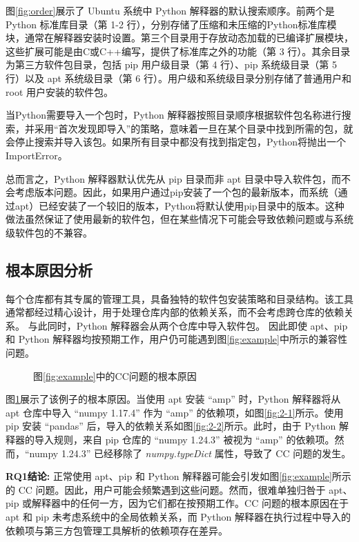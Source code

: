 图\ref{fig:order}展示了 Ubuntu 系统中 Python 解释器的默认搜索顺序。前两个是 Python 标准库目录（第 1-2 行），分别存储了压缩和未压缩的Python标准库模块，通常在解释器安装时设置。第三个目录用于存放动态加载的已编译扩展模块，这些扩展可能是由C或C++编写，提供了标准库之外的功能（第 3 行）。其余目录为第三方软件包目录，包括 pip 用户级目录（第 4 行）、pip 系统级目录（第 5 行）以及 apt 系统级目录（第 6 行）。用户级和系统级目录分别存储了普通用户和 root 用户安装的软件包。

当Python需要导入一个包时，Python 解释器按照目录顺序根据软件包名称进行搜索，并采用“首次发现即导入”的策略，意味着一旦在某个目录中找到所需的包，就会停止搜索并导入该包。如果所有目录中都没有找到指定包，Python将抛出一个ImportError。

总而言之，Python 解释器默认优先从 pip 目录而非 apt 目录中导入软件包，而不会考虑版本问题。因此，如果用户通过pip安装了一个包的最新版本，而系统（通过apt）已经安装了一个较旧的版本，Python将默认使用pip目录中的版本。这种做法虽然保证了使用最新的软件包，但在某些情况下可能会导致依赖问题或与系统级软件包的不兼容。

\subsection{根本原因分析}
每个仓库都有其专属的管理工具，具备独特的软件包安装策略和目录结构。该工具通常都经过精心设计，用于处理仓库内部的依赖关系，而不会考虑跨仓库的依赖关系。
与此同时，Python 解释器会从两个仓库中导入软件包。
因此即使 apt、pip 和 Python 解释器均按预期工作，用户仍可能遇到图\ref{fig:example}中所示的兼容性问题。
\begin{figure}[t]
	\centering
	\hspace{4em}
	\caption{图\ref{fig:example}中的CC问题的根本原因}
	\label{fig:2}
\end{figure}
图\ref{fig:2}展示了该例子的根本原因。当使用 apt 安装 “amp” 时，Python 解释器将从 apt 仓库中导入 “numpy 1.17.4” 作为 “amp” 的依赖项，如图\ref{fig:2-1}所示。使用 pip 安装 “pandas” 后，导入的依赖关系如图\ref{fig:2-2}所示。此时，由于 Python 解释器的导入规则，来自 pip 仓库的 “numpy 1.24.3” 被视为 “amp” 的依赖项。然而，“numpy 1.24.3” 已经移除了 \textit{numpy.typeDict} 属性，导致了 CC 问题的发生。

\begin{tcolorbox}[boxrule=1pt,boxsep=1pt,left=2pt,right=2pt,top=2pt,bottom=2pt]
	\small
	\textcolor{red}{} \noindent\textbf{RQ1结论:} 
	正常使用 apt、pip 和 Python 解释器可能会引发如图\ref{fig:example}所示的 CC 问题。因此，用户可能会频繁遇到这些问题。然而，很难单独归咎于 apt、pip 或解释器中的任何一方，因为它们都在按预期工作。CC 问题的根本原因在于 apt 和 pip 未考虑系统中的全局依赖关系，而 Python 解释器在执行过程中导入的依赖项与第三方包管理工具解析的依赖项存在差异。
\end{tcolorbox} 

